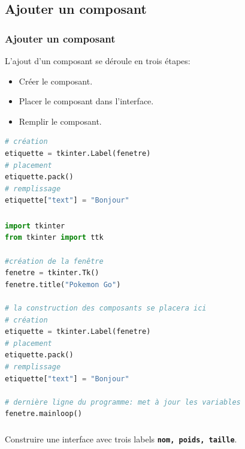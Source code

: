 \documentclass[svgnames,11pt]{beamer}
\begin{document}
\subsection{Ajouter un composant}
\begin{frame}
    \frametitle{Ajouter un composant}

    L'ajout d'un composant se déroule en trois étapes:
    \begin{itemize}
        \item Créer le composant.
        \item Placer le composant dans l'interface.
        \item Remplir le composant.
    \end{itemize}

\end{frame}
\begin{frame}[fragile]

    \begin{center}
        \begin{lstlisting}[language=Python , basicstyle=\ttfamily\small, xleftmargin=1em, xrightmargin=1em]
# création
etiquette = tkinter.Label(fenetre)
# placement
etiquette.pack()
# remplissage
etiquette["text"] = "Bonjour"
\end{lstlisting}
        \label{label}
    \end{center}

\end{frame}
\begin{frame}[fragile]
    \frametitle{}

    \begin{center}
    \begin{lstlisting}[language=Python , basicstyle=\ttfamily\small, xleftmargin=1em, xrightmargin=1em]
import tkinter
from tkinter import ttk

#création de la fenêtre
fenetre = tkinter.Tk()
fenetre.title("Pokemon Go")

# la construction des composants se placera ici
# création
etiquette = tkinter.Label(fenetre)
# placement
etiquette.pack()
# remplissage
etiquette["text"] = "Bonjour"

# dernière ligne du programme: met à jour les variables 
fenetre.mainloop()
\end{lstlisting}
    \label{CODE}
    \end{center}

\end{frame}
\begin{frame}
    \frametitle{}
    \begin{activite}
        Construire une interface avec trois labels \textbf{\texttt{nom, poids, taille}}.
    \end{activite}


\end{frame}
\end{document}
